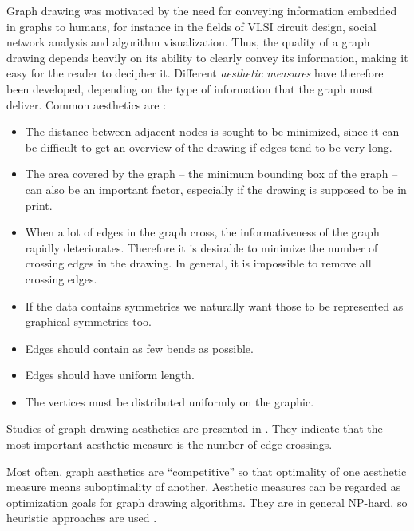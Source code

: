 Graph drawing was motivated by the need for conveying information embedded in
graphs to humans, for instance in the fields of VLSI circuit design, social
network analysis and algorithm visualization. Thus, the quality of a graph
drawing depends heavily on its ability to clearly convey its information,
making it easy for the reader to decipher it. Different \emph{aesthetic
measures} have therefore been developed, depending on the type of information
that the graph must deliver. Common aesthetics are \cite{DiBattista1994}:
\begin{itemize}
	\item The distance between adjacent nodes is
	sought to be minimized, since it can be difficult to get an overview of the
	drawing if edges tend to be very long.
	
	\item The area covered by the graph -- the minimum bounding box of the 
	graph -- can also be an important factor, especially if the drawing is 
	supposed to be in print.
	
	\item When a lot of edges in the graph cross, the informativeness of the 
	graph rapidly deteriorates. Therefore it is desirable to minimize the 
	number of crossing edges in the drawing. In general, it is impossible to 
	remove all crossing edges.
	
	\item If the data contains symmetries we naturally want those to be
	represented as graphical symmetries too.
	
	\item Edges should contain as few bends as possible.
	
	\item Edges should have uniform length.
	
	\item The vertices must be distributed uniformly on the graphic.
\end{itemize}
Studies of graph drawing aesthetics are presented in
\cite{Purchase1997,Purchase2001,Purchase2010}. They indicate that the most
important aesthetic measure is the number of edge crossings.

Most often, graph aesthetics are ``competitive'' so that optimality of one
aesthetic measure means suboptimality of another. Aesthetic measures can be
regarded as optimization goals for graph drawing algorithms. They are in
general NP-hard, so heuristic approaches are used
\cite{Johnson1982,Johnson1984,Garey1983}.

